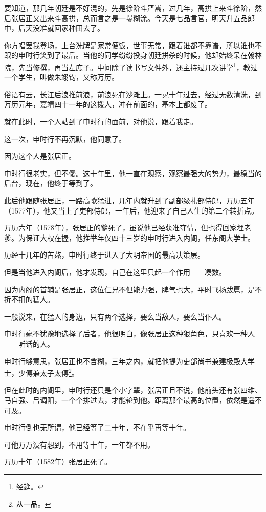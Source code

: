 \begin{multicols}{\theparacolNo}
		要知道，那几年朝廷是不好混的，先是徐阶斗严嵩，过几年，高拱上来斗徐阶，然后张居正又出来斗高拱，总而言之是一塌糊涂。今天是七品言官，明天升五品郎中，后天没准就回家种田去了。

		你方唱罢我登场，上台洗牌是家常便饭，世事无常，跟着谁都不靠谱，所以谁也不跟的申时行笑到了最后。当他的同学纷纷投身朝廷拼杀的时候，他却始终呆在翰林院，先当修撰，再当左庶子。中间除了读书写文件外，还主持过几次讲学\footnote{经筵。}，教过一个学生，叫做朱翊钧，又称万历。

		俗语有云，长江后浪推前浪，前浪死在沙滩上。一晃十年过去，经过无数清洗，到万历元年，嘉靖四十一年的这拨人，冲在前面的，基本上都废了。

		就在此时，一个人站到了申时行的面前，对他说，跟着我走。

		这一次，申时行不再沉默，他同意了。

		因为这个人是张居正。

		申时行很老实，但不傻。这十年里，他一直在观察，观察最强大的势力，最稳当的后台，现在，他终于等到了。

		此后他跟随张居正，一路高歌猛进，几年内就升到了副部级礼部侍郎，万历五年（1577年），他又当上了吏部侍郎，一年后，他迎来了自己人生的第二个转折点。

		万历六年（1578年），张居正的爹死了，虽说他已经获准夺情，但也得回家埋老爹。为保证大权在握，他推举年仅四十三岁的申时行进入内阁，任东阁大学士。

		历经十几年的苦熬，申时行终于进入了大明帝国的最高决策层。

		但是当他进入内阁后，他才发现，自己在这里只起一个作用——凑数。

		因为内阁的首辅是张居正，这位仁兄不但能力强，脾气也大，平时飞扬跋扈，是不折不扣的猛人。

		一般说来，在猛人的身边，只有两个选择，要么当敌人，要么当仆人。

		申时行毫不犹豫地选择了后者，他很明白，像张居正这种狠角色，只喜欢一种人——听话的人。

		申时行够意思，张居正也不含糊，三年之内，就把他提为吏部尚书兼建极殿大学士，少傅兼太子太傅\footnote{从一品。}。

		但在此时的内阁里，申时行还只是个小字辈，张居正且不说，他前头还有张四维、马自强、吕调阳，一个个排过去，才能轮到他。距离那个最高的位置，依然是遥不可及。

		申时行倒也无所谓，他已经等了二十年，不在乎再等十年。

		可他万万没有想到，不用等十年，一年都不用。

		万历十年（1582年）张居正死了。


\end{multicols}
